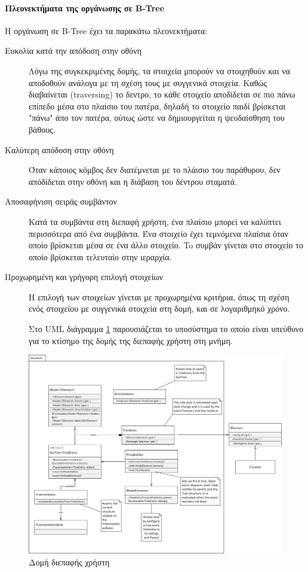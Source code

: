 \paragraph{Πλεονεκτήματα της οργάνωσης σε B-Tree}
Η οργάνωση σε \gls{B-Tree} έχει τα παρακάτω πλεονεκτήματα:
\begin{description}
	\item [Ευκολία κατά την απόδοση στην οθόνη] Λόγω της συγκεκριμένης δομής, τα στοιχεία μπορούν να στοιχηθούν και να αποδοθούν ανάλογα με τη σχέση τους με συγγενικά στοιχεία. Καθώς διαβαίνεται (traversing) το δεντρο, το κάθε στοιχείο αποδίδεται σε πιο πάνω επίπεδο μέσα στο πλαίσιο του πατέρα, δηλαδή το στοιχείο παιδί βρίσκεται "πάνω" άπο τον πατέρα, ούτως ώστε να δημιουργείται η ψευδαίσθηση του βάθους.
	\item [Καλύτερη απόδοση στην οθόνη] Όταν κάποιος κόμβος δεν διατέμνεται με το πλάισιο του παράθυρου, δεν απόδίδεται στην οθόνη και η διάβαση του δέντρου σταματά.
	\item [Αποσαφήνιση σειράς συμβάντον] Κατά τα συμβάντα στη διεπαφή χρήστη, ένα πλαίσιο μπορεί να καλύπτει περισσότερα από ένα συμβάντα. Ένα στοιχείο έχει τεμνόμενα πλαίσια όταν οποίο βρίσκεται μέσα σε ένα άλλο στοιχείο. To συμβάν γίνεται στο στοιχείο το οποίο βρίσκεται τελευταίο στην ιεραρχία.
	\item [Προχωρημένη και γρήγορη επιλογή στοιχείων] Η επιλογή των στοιχείων γίνεται με προχωρημένα κριτήρια, όπως τη σχέση ενός στοιχείου με συγγενικά στοιχεία στη δομή, και σε λογαριθμηκό χρόνο.
	
Στο \gls{UML} διάγραμμα \ref{fig:ui_structure} παρουσιάζεται το υποσύστημα το οποίο είναι υπεύθυνο για το κτίσημο της δομής της διεπαφής χρήστη στη μνήμη.
\end{description}
	\begin{figure}[h!]
		\centering
		\includegraphics[width=165mm]{Images/gui_structure}
		\caption{Δομή διεπαφής χρήστη}
		\label{fig:ui_structure}
	\end{figure}

